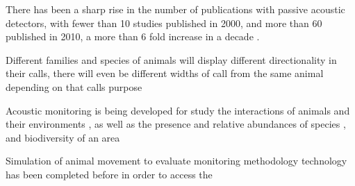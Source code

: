 There has been a sharp rise in the number of publications with passive acoustic detectors, with fewer than 10 studies published in 2000, and more than 60 published in 2010, a more than 6 fold increase in a decade \citep{kessel2014review}. 

Different families and species of animals will display different directionality in their calls, there will even be different widths of call from the same animal depending on that calls purpose \citep{jakobsen2012convergent}


Acoustic monitoring is being developed for study the interactions of animals and their environments \citep{blumstein2011acoustic, straight2014passive, marcoux2011local, rogers2013density}, as well as the presence and relative abundances of species \citep{mckown2012wireless, marcoux2011local}, and biodiversity of an area \citep{ depraetere2012monitoring}


Simulation of animal movement to evaluate monitoring methodology technology has been completed before \citep{ivan2013using, rees2011testing} in order to access the 


